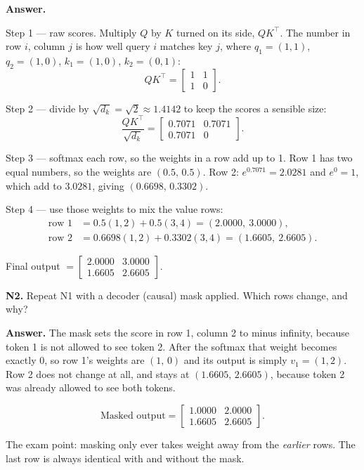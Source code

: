 \documentclass[11pt]{article}
\begin{document}
\textbf{Answer.}

Step 1 --- raw scores. Multiply $Q$ by $K$ turned on its side, $QK^{\top}$. The number in row
$i$, column $j$ is how well query $i$ matches key $j$, where $q_1=(1,1)$, $q_2=(1,0)$,
$k_1=(1,0)$, $k_2=(0,1)$:
\[
QK^{\top}=\begin{bmatrix}1 & 1\\ 1 & 0\end{bmatrix}.
\]

Step 2 --- divide by $\sqrt{d_k}=\sqrt{2}\approx 1.4142$ to keep the scores a sensible size:
\[
\frac{QK^{\top}}{\sqrt{d_k}}=\begin{bmatrix}0.7071 & 0.7071\\ 0.7071 & 0\end{bmatrix}.
\]

Step 3 --- softmax each row, so the weights in a row add up to 1. Row 1 has two equal numbers,
so the weights are $(0.5,\,0.5)$. Row 2: $e^{0.7071}=2.0281$ and $e^{0}=1$, which add to
$3.0281$, giving $(0.6698,\,0.3302)$.

Step 4 --- use those weights to mix the value rows:
\begin{align*}
\text{row 1} &= 0.5(1,2)+0.5(3,4) = (2.0000,\ 3.0000),\\
\text{row 2} &= 0.6698(1,2)+0.3302(3,4) = (1.6605,\ 2.6605).
\end{align*}

Final output $=\begin{bmatrix}2.0000 & 3.0000\\ 1.6605 & 2.6605\end{bmatrix}$.

\medskip
\textbf{N2.} Repeat N1 with a decoder (causal) mask applied. Which rows change, and why?

\textbf{Answer.} The mask sets the score in row 1, column 2 to minus infinity, because token 1
is not allowed to see token 2. After the softmax that weight becomes exactly 0, so row 1's
weights are $(1,\,0)$ and its output is simply $v_1=(1,2)$. Row 2 does not change at all, and
stays at $(1.6605,\,2.6605)$, because token 2 was already allowed to see both tokens.

\[
\text{Masked output}=\begin{bmatrix}1.0000 & 2.0000\\ 1.6605 & 2.6605\end{bmatrix}.
\]

The exam point: masking only ever takes weight away from the \emph{earlier} rows. The last row
is always identical with and without the mask.
\end{document}
